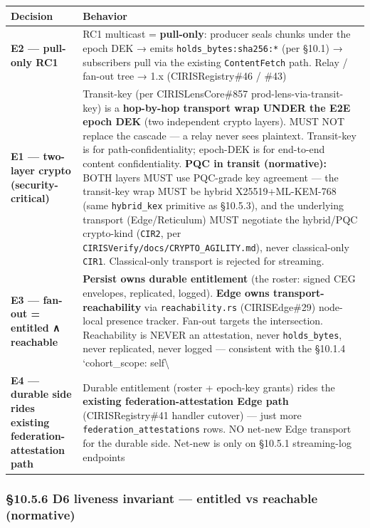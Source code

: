 \documentclass[10pt]{article}
\begin{document}
{\footnotesize
\begin{longtable}{|p{8.0cm}|p{8.0cm}|}\hline
\textbf{Decision} & \textbf{Behavior} \\ \hline\endhead
\textbf{E2 — pull-only RC1} & RC1 multicast = \textbf{pull-only}: producer seals chunks under the epoch DEK → emits \texttt{holds\_bytes:sha256:*} (per §10.1) → subscribers pull via the existing \texttt{ContentFetch} path. Relay / fan-out tree → 1.x (CIRISRegistry\#46 / \#43) \\ \hline
\textbf{E1 — two-layer crypto (security-critical)} & Transit-key (per CIRISLensCore\#857 prod-lens-via-transit-key) is a \textbf{hop-by-hop transport wrap UNDER the E2E epoch DEK} (two independent crypto layers). MUST NOT replace the cascade — a relay never sees plaintext. Transit-key is for path-confidentiality; epoch-DEK is for end-to-end content confidentiality. \textbf{PQC in transit (normative):} BOTH layers MUST use PQC-grade key agreement — the transit-key wrap MUST be hybrid X25519+ML-KEM-768 (same \texttt{hybrid\_kex} primitive as §10.5.3), and the underlying transport (Edge/Reticulum) MUST negotiate the hybrid/PQC crypto-kind (\texttt{CIR2}, per \texttt{CIRISVerify/docs/CRYPTO\_AGILITY.md}), never classical-only \texttt{CIR1}. Classical-only transport is rejected for streaming. \\ \hline
\textbf{E3 — fan-out = entitled ∧ reachable} & \textbf{Persist owns durable entitlement} (the roster: signed CEG envelopes, replicated, logged). \textbf{Edge owns transport-reachability} via \texttt{reachability.rs} (CIRISEdge\#29) node-local presence tracker. Fan-out targets the intersection. Reachability is NEVER an attestation, never \texttt{holds\_bytes}, never replicated, never logged — consistent with the §10.1.4 `cohort\_scope: self\textbackslash{} \\ \hline
\textbf{E4 — durable side rides existing federation-attestation path} & Durable entitlement (roster + epoch-key grants) rides the \textbf{existing federation-attestation Edge path} (CIRISRegistry\#41 handler cutover) — just more \texttt{federation\_attestations} rows. NO net-new Edge transport for the durable side. Net-new is only on §10.5.1 streaming-log endpoints \\ \hline
\end{longtable}}


\subsubsection*{§10.5.6 D6 liveness invariant — entitled vs reachable (normative)}
\end{document}
